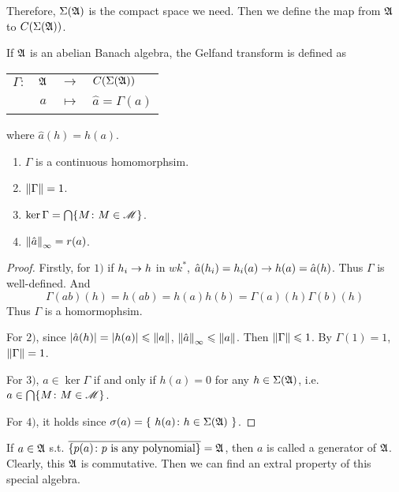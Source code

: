 Therefore, $\Sigma(\mathfrak{A})$ is the compact space we need. Then we define the map from $\mathfrak{A}$ to $C(\Sigma(\mathfrak{A}))$.

\begin{thm} \label{thm5}
	If $\mathfrak{A}$ is an abelian Banach algebra, the Gelfand transform is defined as
	\begin{center}
		\begin{tabular}{l c c l}
			$\Gamma \colon$ & $\mathfrak{A}$ & $\longrightarrow$ & $C(\Sigma(\mathfrak{A}))$ \\
			~ & $a$ & $\longmapsto$ & $\hat{a} = \Gamma(a)$
		\end{tabular}
	\end{center}
	where $\hat{a}(h)=h(a)$.
	\begin{enumerate}[label=\arabic*)]
		\item $\Gamma$ is a continuous homomorphsim.
		\item $\left\lVert\Gamma\right\lVert=1$.
		\item $\ker{\Gamma}=\bigcap\{M \colon M \in \mathscr{M}\}$.
		\item $\left\lVert\hat{a}\right\lVert_{\infty}=r(a)$.
	\end{enumerate}
\end{thm}
\begin{proof}
	Firstly, for $1)$ if $h_i \rightarrow h$ in $wk^{*}$, $\hat{a}(h_i) = h_i(a) \rightarrow h(a) = \hat{a}(h)$. Thus $\Gamma$ is well-defined. And
	\begin{equation*}
		\Gamma(ab)(h) = h(ab) = h(a)h(b) = \Gamma(a)(h)\Gamma(b)(h)
	\end{equation*}
	Thus $\Gamma$ is a homormophsim.
	\item For $2)$, since $\left\lvert\hat{a}(h)\right\lvert = \left\lvert h(a)\right\lvert \leqslant \left\lVert a\right\lVert$, $\left\lVert\hat{a}\right\lVert_{\infty} \leqslant \left\lVert a\right\lVert$. Then $\left\lVert\Gamma\right\lVert \leqslant 1$. By $\Gamma(1) = 1$, $\left\lVert\Gamma\right\lVert = 1$.
	\item For $3)$, $a \in \ker{\Gamma}$ if and only if $h(a) = 0$ for any $h \in \Sigma(\mathfrak{A})$, i.e. $a \in \bigcap\{M \colon M \in \mathscr{M}\}$. 
	\item For $4)$, it holds since $\sigma(a) = \{~ h(a) \colon h \in \Sigma(\mathfrak{A}) ~\}$.
\end{proof}

If $a \in \mathfrak{A}$ s.t. $\overline{\{p(a) \colon p \text{ is any polynomial}\}} = \mathfrak{A}$, then $a$ is called a generator of $\mathfrak{A}$. Clearly, this $\mathfrak{A}$ is commutative. Then we can find an extral property of this special algebra.

